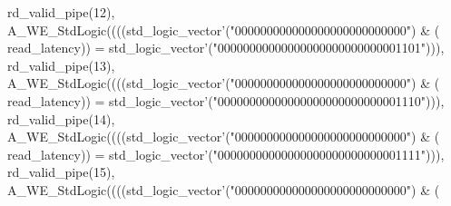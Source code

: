 \begin{DoxyCode}
{      rd_valid_pipe}\textcolor{vhdlchar}{(}\textcolor{vhdllogic}{}\textcolor{vhdllogic}{12}\textcolor{vhdlchar}{)}\textcolor{vhdlchar}{,} \textcolor{vhdlchar}{A\_WE\_StdLogic}\textcolor{vhdlchar}{(}\textcolor{vhdlchar}{(}\textcolor{vhdlchar}{(}\textcolor{vhdlchar}{(}\textcolor{comment}{std\_logic\_vector}\textcolor{vhdlchar}{'}\textcolor{vhdlchar}{(}\textcolor{vhdllogic}{"000000000000000000000000000"}\textcolor{vhdlchar}{)} \textcolor{vhdlchar}{&} \textcolor{vhdlchar}{(}\textcolor{vhdlchar}{
      read_latency}\textcolor{vhdlchar}{)}\textcolor{vhdlchar}{)} \textcolor{vhdlchar}{=} \textcolor{comment}{std\_logic\_vector}\textcolor{vhdlchar}{'}\textcolor{vhdlchar}{(}\textcolor{vhdllogic}{"00000000000000000000000000001101"}\textcolor{vhdlchar}{)}\textcolor{vhdlchar}{)}\textcolor{vhdlchar}{)}\textcolor{vhdlchar}{,} \textcolor{vhdlchar}{
      rd_valid_pipe}\textcolor{vhdlchar}{(}\textcolor{vhdllogic}{}\textcolor{vhdllogic}{13}\textcolor{vhdlchar}{)}\textcolor{vhdlchar}{,} \textcolor{vhdlchar}{A\_WE\_StdLogic}\textcolor{vhdlchar}{(}\textcolor{vhdlchar}{(}\textcolor{vhdlchar}{(}\textcolor{vhdlchar}{(}\textcolor{comment}{std\_logic\_vector}\textcolor{vhdlchar}{'}\textcolor{vhdlchar}{(}\textcolor{vhdllogic}{"000000000000000000000000000"}\textcolor{vhdlchar}{)} \textcolor{vhdlchar}{&} \textcolor{vhdlchar}{(}\textcolor{vhdlchar}{
      read_latency}\textcolor{vhdlchar}{)}\textcolor{vhdlchar}{)} \textcolor{vhdlchar}{=} \textcolor{comment}{std\_logic\_vector}\textcolor{vhdlchar}{'}\textcolor{vhdlchar}{(}\textcolor{vhdllogic}{"00000000000000000000000000001110"}\textcolor{vhdlchar}{)}\textcolor{vhdlchar}{)}\textcolor{vhdlchar}{)}\textcolor{vhdlchar}{,} \textcolor{vhdlchar}{
      rd_valid_pipe}\textcolor{vhdlchar}{(}\textcolor{vhdllogic}{}\textcolor{vhdllogic}{14}\textcolor{vhdlchar}{)}\textcolor{vhdlchar}{,} \textcolor{vhdlchar}{A\_WE\_StdLogic}\textcolor{vhdlchar}{(}\textcolor{vhdlchar}{(}\textcolor{vhdlchar}{(}\textcolor{vhdlchar}{(}\textcolor{comment}{std\_logic\_vector}\textcolor{vhdlchar}{'}\textcolor{vhdlchar}{(}\textcolor{vhdllogic}{"000000000000000000000000000"}\textcolor{vhdlchar}{)} \textcolor{vhdlchar}{&} \textcolor{vhdlchar}{(}\textcolor{vhdlchar}{
      read_latency}\textcolor{vhdlchar}{)}\textcolor{vhdlchar}{)} \textcolor{vhdlchar}{=} \textcolor{comment}{std\_logic\_vector}\textcolor{vhdlchar}{'}\textcolor{vhdlchar}{(}\textcolor{vhdllogic}{"00000000000000000000000000001111"}\textcolor{vhdlchar}{)}\textcolor{vhdlchar}{)}\textcolor{vhdlchar}{)}\textcolor{vhdlchar}{,} \textcolor{vhdlchar}{
      rd_valid_pipe}\textcolor{vhdlchar}{(}\textcolor{vhdllogic}{}\textcolor{vhdllogic}{15}\textcolor{vhdlchar}{)}\textcolor{vhdlchar}{,} \textcolor{vhdlchar}{A\_WE\_StdLogic}\textcolor{vhdlchar}{(}\textcolor{vhdlchar}{(}\textcolor{vhdlchar}{(}\textcolor{vhdlchar}{(}\textcolor{comment}{std\_logic\_vector}\textcolor{vhdlchar}{'}\textcolor{vhdlchar}{(}\textcolor{vhdllogic}{"000000000000000000000000000"}\textcolor{vhdlchar}{)} \textcolor{vhdlchar}{&} \textcolor{vhdlchar}{(}\textcolor{vhdlchar}{
}
\end{DoxyCode}
